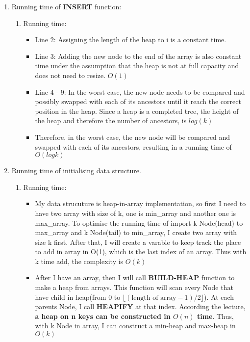 \documentclass{article}
\begin{document}
\begin{enumerate}
\begin{enumerate}
\begin{itemize}
			\end{itemize}
		\end{enumerate}
		\item Running time of \textbf{INSERT} function:
		\begin{enumerate}
			\item Running time:
			\begin{itemize}
				\item Line 2: Assigning the length of the heap to i is a constant time.
				\item Line 3: Adding the new node to the end of the array is also constant time under the assumption that the heap is not at full capacity and does not need to resize. \(O(1)\)
				\item Line 4 - 9: In the worst case, the new node needs to be compared and possibly swapped with each of its ancestors until it reach the correct position in the heap. Since a heap is a completed tree, the height of the heap and therefore the number of ancestors, is \(log(k)\)
				\item Therefore, in the worst case, the new node will be compared and swapped with each of its ancestors, resulting in a running time of \(O(logk)\)
			\end{itemize}
		\end{enumerate}
		\item Running time of initialising data structure.
		\begin{enumerate}
			\item Running time:
			\begin{itemize}
				\item  My data strucuture is heap-in-array implementation, so first I need to have two array with size of k, one is min\_array and another one is max\_array. To optimise the running time of import k Node(head) to max\_array and k Node(tail) to min\_array, I create two array with size k first. After that, I will create a varable to keep track the place to add in array in O(1), which is the last index of an array. Thus with k time add, the complexity is \(O(k)\)
				\item After I have an array, then I will call \textbf{BUILD-HEAP} function to make a heap from arrays. This function will scan every Node that have child in heap(from 0 to \(\lfloor (\text{length of array} - 1) / 2 \rfloor\)). At each parents Node, I call \textbf{HEAPIFY} at that index. According the lecture, \textbf{a heap on n keys can be constructed in \(O(n)\) time}. Thus, with k Node in array, I can construct a min-heap and max-heap in \(O(k)\)

\end{itemize}
\end{enumerate}
\end{enumerate}
\end{document}
